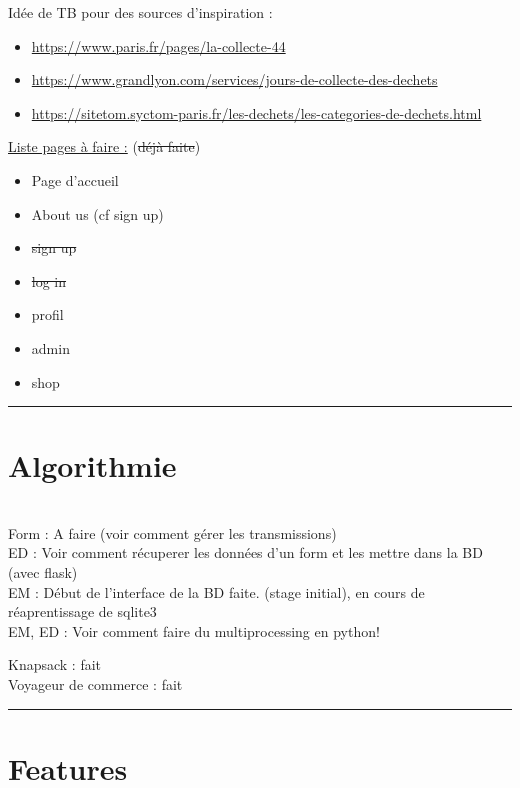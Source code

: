 \documentclass[10pt,a4paper]{report}
\begin{document}
Idée de TB pour des sources d'inspiration : 
\begin{itemize}
        \item \url{https://www.paris.fr/pages/la-collecte-44}
        \item \url{https://www.grandlyon.com/services/jours-de-collecte-des-dechets }
        \item \url{https://sitetom.syctom-paris.fr/les-dechets/les-categories-de-dechets.html}
\end{itemize}

\uline{Liste pages à faire :} (\sout{déjà faite})
\begin{itemize}
        \item Page d'accueil
        \item About us (cf sign up)
        \item \sout{sign up}
        \item \sout{log in}
        \item profil
        \item admin
        \item shop
\end{itemize}

\rule{\linewidth}{0.5mm} \bigskip
\section{Algorithmie}
\ \\

Form : A faire (voir comment gérer les transmissions) \\

ED : Voir comment récuperer les données d'un form et les mettre dans la BD (avec flask) \\

EM : Début de l'interface de la BD faite. (stage initial), en cours de réaprentissage de sqlite3 \\

EM, ED : Voir comment faire du multiprocessing en python!

Knapsack : fait\ \\

Voyageur de commerce : fait


\rule{\linewidth}{0.5mm} \bigskip
\section{Features}
\end{document}
